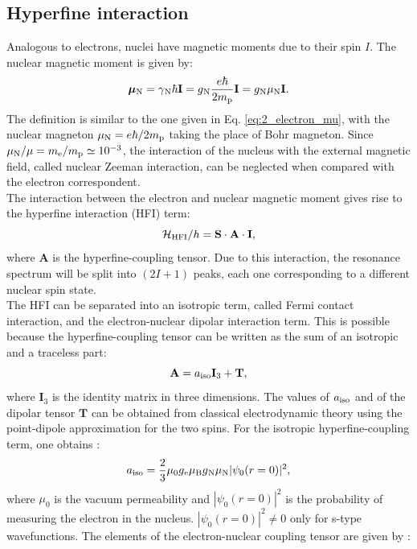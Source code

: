 \documentclass[a4paper]{book}
\newcommand{\tsub}{\textsubscript}
\newcommand{\mb}{\mathbf}
\begin{document}
	\subsection{Hyperfine interaction}
	Analogous to electrons, nuclei have magnetic moments due to their spin $I$. The nuclear magnetic moment is given by:
	\begin{equation}
		\boldsymbol{\mu}\tsub{N} =
		\gamma\tsub{N}\hbar\mb{I} =
		g\tsub{N}\frac{e\hbar}{2m\tsub{p}}\mb{I} =
		g\tsub{N}\mu\tsub{N}\mb{I}.
		\label{eq:2_nuclear_mu}
	\end{equation}
	The definition is similar to the one given in Eq. \eqref{eq:2_electron_mu}, with the nuclear magneton $\mu\tsub{N} = e\hbar/2m\tsub{p}$ taking the place of Bohr magneton. Since $\mu\tsub{N}/\mu = m\tsub{e}/m\tsub{p} \simeq 10^{-3}$, the interaction of the nucleus with the external magnetic field, called nuclear Zeeman interaction, can be neglected when compared with the electron correspondent.\\
	The interaction between the electron and nuclear magnetic moment gives rise to the hyperfine interaction (HFI) term:
	\begin{equation}
		\mathcal{H}\tsub{HFI}/h = \mb{S} \cdot \mb{A} \cdot \mb{I},
	\end{equation}
	where $\mb{A}$ is the hyperfine-coupling tensor. Due to this interaction, the resonance spectrum will be split into $(2I+1)$ peaks, each one corresponding to a different nuclear spin state.\\
	The HFI can be separated into an isotropic term, called Fermi contact interaction, and the electron-nuclear dipolar interaction term. This is possible because the hyperfine-coupling tensor can be written as the sum of an isotropic and a traceless part:
	\begin{equation}
		\mb{A} = a\tsub{iso}\mb{I}_3 + \mb{T},
	\end{equation}
	where $\mb{I}_3$ is the identity matrix in three dimensions. The values of $a\tsub{iso}$ and of the dipolar tensor $\mb T$ can be obtained from classical electrodynamic theory using the point-dipole approximation for the two spins. For the isotropic hyperfine-coupling term, one obtains \cite{bennatiEPRInteractionsHyperfine2017}:
	\begin{equation}
		a\tsub{iso} =
		\frac{2}{3}\mu_0g\tsub e \mu\tsub B g\tsub N\mu\tsub N |\psi_0(r = 0)|^2 ,
		\label{eq:2_aiso}
	\end{equation}
	where $\mu_0$ is the vacuum permeability and $|\psi_0(r = 0)|^2$ is the probability of measuring the electron in the nucleus. $|\psi_0(r = 0)|^2 \neq 0$ only for s-type wavefunctions. The elements of the electron-nuclear coupling tensor are given by \cite{bennatiEPRInteractionsHyperfine2017}:
\end{document}
